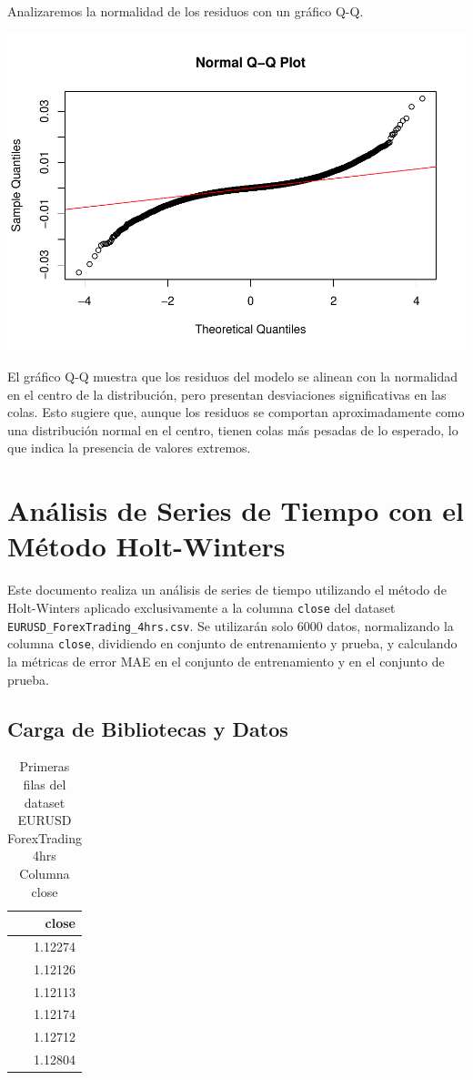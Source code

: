 \documentclass[
]{book}
\begin{document}
Analizaremos la normalidad de los residuos con un gráfico Q-Q.

\includegraphics{bookdown_time_series_files/figure-latex/residuals-qqplot-1.pdf}

El gráfico Q-Q muestra que los residuos del modelo se alinean con la normalidad en el centro de la distribución, pero presentan desviaciones significativas en las colas. Esto sugiere que, aunque los residuos se comportan aproximadamente como una distribución normal en el centro, tienen colas más pesadas de lo esperado, lo que indica la presencia de valores extremos.

\chapter{Análisis de Series de Tiempo con el Método Holt-Winters}\label{anuxe1lisis-de-series-de-tiempo-con-el-muxe9todo-holt-winters}

Este documento realiza un análisis de series de tiempo utilizando el método de Holt-Winters aplicado exclusivamente a la columna \texttt{close} del dataset \texttt{EURUSD\_ForexTrading\_4hrs.csv}. Se utilizarán solo 6000 datos, normalizando la columna \texttt{close}, dividiendo en conjunto de entrenamiento y prueba, y calculando la métricas de error MAE en el conjunto de entrenamiento y en el conjunto de prueba.

\section{Carga de Bibliotecas y Datos}\label{carga-de-bibliotecas-y-datos}

\begin{table}
\centering
\caption{\label{tab:cargar-datos}Primeras filas del dataset EURUSD ForexTrading 4hrs Columna close}
\centering
\begin{tabular}[t]{r}
\hline
close\\
\hline
1.12274\\
\hline
1.12126\\
\hline
1.12113\\
\hline
1.12174\\
\hline
1.12712\\
\hline
1.12804\\
\hline
\end{tabular}
\end{table}
\end{document}

